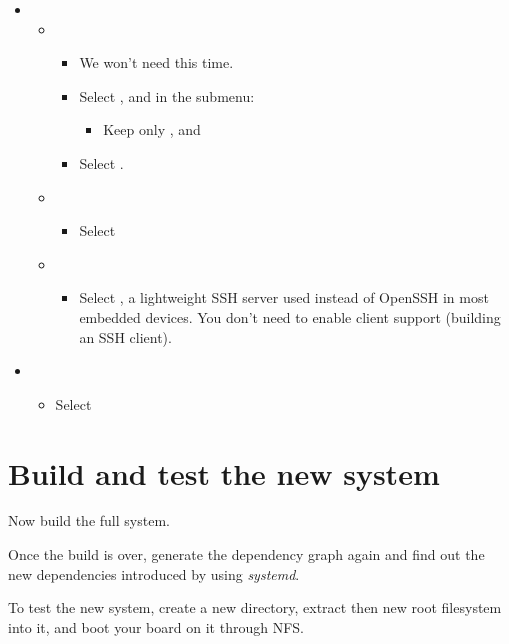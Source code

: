 \begin{itemize}
\begin{itemize}
  \end{itemize}
\item {}
  \begin{itemize}
  \item {}
    \begin{itemize}
    \item We won't need  this time.
    \item Select , and in the submenu:
      \begin{itemize}
           \item Keep only ,  and 
      \end{itemize}
    \item Select .
    \end{itemize}
  \item {}
    \begin{itemize}
    \item Select 
    \end{itemize}
  \item {}
    \begin{itemize}
    \item Select , a lightweight SSH server used instead
          of OpenSSH in most embedded devices. You don't need to enable
          client support (building an SSH client).
    \end{itemize}
  \end{itemize}
\item {}
  \begin{itemize}
     \item Select 
  \end{itemize}
\end{itemize}

\section{Build and test the new system}

Now build the full system.

Once the build is over, generate the dependency graph again and find out
the new dependencies introduced by using {\em systemd}.

To test the new system, create a new  directory, extract
then new root filesystem into it, and boot your board on it through NFS.


